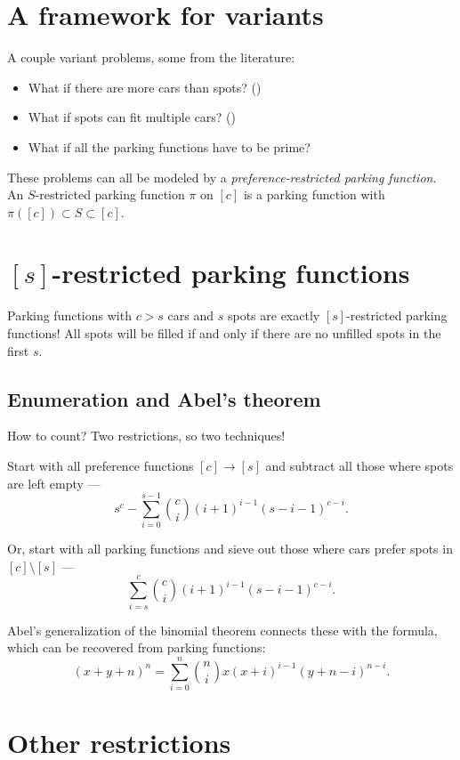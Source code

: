 \documentclass[thesis]{hmcposter}
\begin{document}
\begin{poster}
\section{A framework for variants}%

A couple variant problems, some from the literature:
\begin{itemize}
\item What if there are more cars than spots? (\cite{cameron-johannsen-prellberg-schweitzer-2008})
\item What if spots can fit multiple cars? (\cite{blake-konheim-1977})
\item What if all the parking functions have to be prime?
\end{itemize}

These problems can all be modeled by a \emph{preference-restricted parking function}. An $S$-restricted parking function $\pi$ on $[c]$ is a parking function with $\pi([c]) \subset S \subset [c]$.

\section{$[s]$-restricted parking functions}

Parking functions with $c > s$ cars and $s$ spots are exactly $[s]$-restricted parking functions! All spots will be filled if and only if there are no unfilled spots in the first $s$.

\subsection{Enumeration and Abel's theorem}

How to count? Two restrictions, so two techniques! 

Start with all preference functions $[c] \to [s]$ and subtract all those where spots are left empty ---
\[
	s^{c} - \sum_{i = 0}^{s - 1} \binom{c}{i} (i + 1)^{i - 1} (s - i - 1)^{c - i}.
\]

Or, start with all parking functions and sieve out those where cars prefer spots in $[c] \setminus [s]$ ---
\[
	\sum_{i = s}^{c} \binom{c}{i} (i + 1)^{i - 1} (s - i - 1)^{c - i}.
\]

Abel's generalization of the binomial theorem connects these with the formula, which can be recovered from parking functions:
\[
	(x + y + n)^{n} = \sum_{i = 0}^{n} \binom{n}{i} x (x + i)^{i - 1} (y + n - i)^{n - i}.
\]

\newcolumn 
\section{Other restrictions}


\end{poster}
\end{document}

